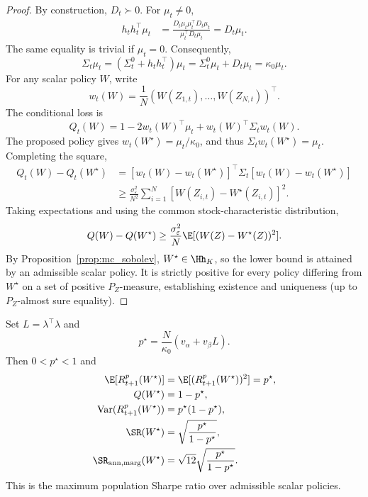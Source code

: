 \begin{proof}
By construction, $D_t\succ0$. For $\mu_t\neq0$,
\begin{align*}
h_th_t^\top\mu_t
&=\frac{D_t\mu_t\mu_t^\top D_t\mu_t}
{\mu_t^\top D_t\mu_t}
=D_t\mu_t.
\end{align*}
The same equality is trivial if $\mu_t=0$. Consequently,
\[
\Sigma_t\mu_t=(\Sigma_t^0+h_th_t^\top)\mu_t
=\Sigma_t^0\mu_t+D_t\mu_t=\kappa_0\mu_t.
\]
For any scalar policy $W$, write
\[
w_t(W)=\frac1N(W(Z_{1,t}),\ldots,W(Z_{N,t}))^\top.
\]
The conditional loss is
\[
Q_t(W)=1-2w_t(W)^\top\mu_t+w_t(W)^\top\Sigma_tw_t(W).
\]
The proposed policy gives $w_t(W^\star)=\mu_t/\kappa_0$, and thus
$\Sigma_tw_t(W^\star)=\mu_t$. Completing the square,
\begin{align*}
Q_t(W)-Q_t(W^\star)
&=[w_t(W)-w_t(W^\star)]^\top\Sigma_t
[w_t(W)-w_t(W^\star)]\\
&\geq\frac{\sigma_\varepsilon^2}{N^2}
\sum_{i=1}^N[W(Z_{i,t})-W^\star(Z_{i,t})]^2.
\end{align*}
Taking expectations and using the common stock-characteristic distribution,
\[
Q(W)-Q(W^\star)\geq\frac{\sigma_\varepsilon^2}{N}
\E[(W(Z)-W^\star(Z))^2].
\]
By Proposition~\ref{prop:mc_sobolev}, $W^\star\in\Hh_K$, so the lower bound is
attained by an admissible scalar policy. It is strictly positive for every
policy differing from $W^\star$ on a set of positive $P_Z$-measure, establishing
existence and uniqueness (up to $P_Z$-almost sure equality).
\end{proof}
\begin{proposition}
\label{prop:mc_sharpe}
Set $L=\lambda^\top\lambda$ and
\[
p^\star=\frac{N}{\kappa_0}(v_\alpha+v_\beta L).
\]
Then $0<p^\star<1$ and
\begin{align*}
\E[R^p_{t+1}(W^\star)]&=\E[(R^p_{t+1}(W^\star))^2]=p^\star,\\
Q(W^\star)&=1-p^\star,\\
\operatorname{Var}(R^p_{t+1}(W^\star))&=p^\star(1-p^\star),\\
\SR(W^\star)&=\sqrt{\frac{p^\star}{1-p^\star}},\\
\SR_{\mathrm{ann,marg}}(W^\star)&=\sqrt{12}\sqrt{\frac{p^\star}{1-p^\star}}.
\end{align*}
This is the maximum population Sharpe ratio over admissible scalar policies.
\end{proposition}
